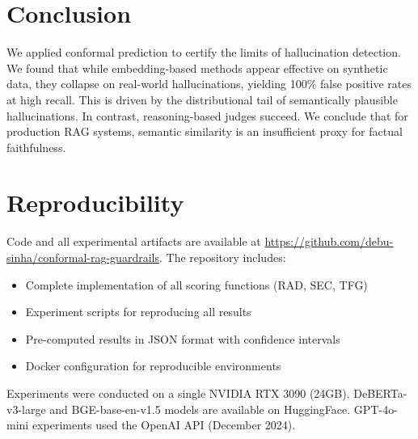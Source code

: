 \documentclass[11pt]{article}
\begin{document}
\section{Conclusion}

We applied conformal prediction to certify the limits of hallucination detection. We found that while embedding-based methods appear effective on synthetic data, they collapse on real-world hallucinations, yielding 100\% false positive rates at high recall. This is driven by the distributional tail of semantically plausible hallucinations. In contrast, reasoning-based judges succeed. We conclude that for production RAG systems, semantic similarity is an insufficient proxy for factual faithfulness.

\section*{Reproducibility}
Code and all experimental artifacts are available at \url{https://github.com/debu-sinha/conformal-rag-guardrails}. The repository includes:
\begin{itemize}
    \item Complete implementation of all scoring functions (RAD, SEC, TFG)
    \item Experiment scripts for reproducing all results
    \item Pre-computed results in JSON format with confidence intervals
    \item Docker configuration for reproducible environments
\end{itemize}
Experiments were conducted on a single NVIDIA RTX 3090 (24GB). DeBERTa-v3-large and BGE-base-en-v1.5 models are available on HuggingFace. GPT-4o-mini experiments used the OpenAI API (December 2024).
\end{document}
